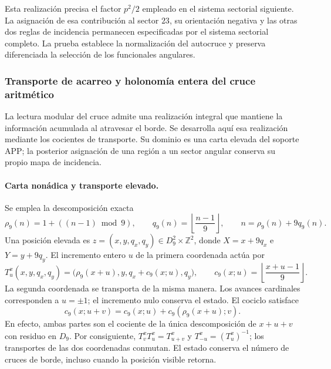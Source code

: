 Esta realización precisa el factor $p^2/2$ empleado en el sistema
sectorial siguiente. La asignación de esa contribución al sector $23$,
su orientación negativa y las otras dos reglas de incidencia permanecen
especificadas por el sistema sectorial completo. La prueba establece la
normalización del autocruce y preserva diferenciada la selección de los
funcionales angulares.




\subsubsection{Transporte de acarreo y holonomía entera del cruce aritmético}
\label{ii:subsec:transporte-entero-cruce}

La lectura modular del cruce admite una realización integral que mantiene
la información acumulada al atravesar el borde. Se desarrolla aquí esa
realización mediante los cocientes de transporte. Su dominio es una carta
elevada del soporte APP; la posterior asignación de una región a un sector
angular conserva su propio mapa de incidencia.

\paragraph{Carta nonádica y transporte elevado.}
Se emplea la descomposición exacta
\[
 \rho_9(n)=1+((n-1)\bmod9),\qquad
 q_9(n)=\left\lfloor\frac{n-1}{9}\right\rfloor,
 \qquad n=\rho_9(n)+9q_9(n).
\]
Una posición elevada es
$z=(x,y,q_x,q_y)\in D_9^2\times\mathbb Z^2$, donde
$X=x+9q_x$ e $Y=y+9q_y$. El incremento entero $u$ de la primera
coordenada actúa por
\[
 T^x_u(x,y,q_x,q_y)=
 \bigl(\rho_9(x+u),y,q_x+c_9(x;u),q_y\bigr),\qquad
 c_9(x;u)=\left\lfloor\frac{x+u-1}{9}\right\rfloor.
\]
La segunda coordenada se transporta de la misma manera. Los avances
cardinales corresponden a $u=\pm1$; el incremento nulo conserva el estado.
El cociclo satisface
\[
 c_9(x;u+v)=c_9(x;u)+c_9(\rho_9(x+u);v).
\]
En efecto, ambas partes son el cociente de la única descomposición de
$x+u+v$ con residuo en $D_9$. Por consiguiente,
$T^x_vT^x_u=T^x_{u+v}$ y $T^x_{-u}=(T^x_u)^{-1}$; los transportes
de las dos coordenadas conmutan. El estado conserva el número de cruces
de borde, incluso cuando la posición visible retorna.

